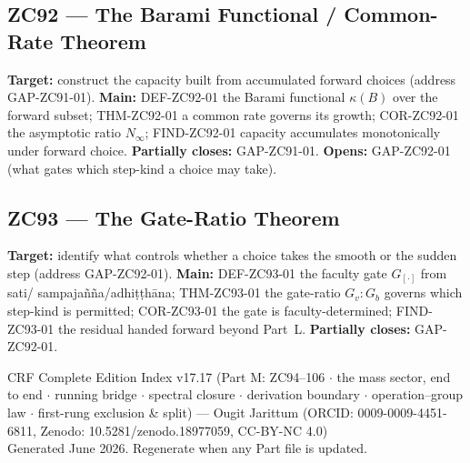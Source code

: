 \documentclass[11pt, a4paper]{article}
\begin{document}
\subsection{ZC92 --- The Barami Functional / Common-Rate Theorem}
\begin{zcbox}[title={ZC92: THM-ZC92-01 --- Barami Functional}]
\sloppy
\textbf{Target:} construct the capacity built from accumulated forward
choices (address GAP-ZC91-01).
\textbf{Main:} DEF-ZC92-01 the Barami functional $\kappa(B)$ over the
forward subset; THM-ZC92-01 a common rate governs its growth;
COR-ZC92-01 the asymptotic ratio $N_{\infty}$; FIND-ZC92-01 capacity
accumulates monotonically under forward choice.
\textbf{Partially closes:} GAP-ZC91-01.
\textbf{Opens:} GAP-ZC92-01 (what gates which step-kind a choice may take).
\end{zcbox}

\subsection{ZC93 --- The Gate-Ratio Theorem}
\begin{zcbox}[title={ZC93: THM-ZC93-01 --- Gate-Ratio}]
\sloppy
\textbf{Target:} identify what controls whether a choice takes the smooth
or the sudden step (address GAP-ZC92-01).
\textbf{Main:} DEF-ZC93-01 the faculty gate $G_{[\cdot]}$ from sati/
sampaja\~n\~na/adhi\d{t}\d{t}h\=ana; THM-ZC93-01 the gate-ratio
$G_v\!:\!G_b$ governs which step-kind is permitted; COR-ZC93-01 the gate is
faculty-determined; FIND-ZC93-01 the residual handed forward beyond Part~L.
\textbf{Partially closes:} GAP-ZC92-01.
\end{zcbox}


\newpage

\begin{center}
\small\color{mutedgray}
CRF Complete Edition Index v17.17 (Part M: ZC94--106 $\cdot$ the mass sector,
  end to end $\cdot$ running bridge $\cdot$ spectral closure $\cdot$
  derivation boundary $\cdot$ operation--group law $\cdot$
  first-rung exclusion \& split) ---
Ougit Jarittum (ORCID: 0009-0009-4451-6811,
  Zenodo: 10.5281/zenodo.18977059, CC-BY-NC 4.0)\\
Generated June 2026. Regenerate when any Part file is updated.
\end{center}
\end{document}
